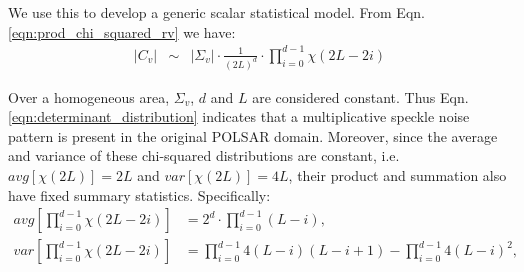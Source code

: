 \documentclass[]{tRSL2e}
\begin{document}
We use this to develop a generic scalar statistical model. %
From Eqn. \ref{eqn:prod_chi_squared_rv} we have:
\vspace{-2mm}
\begin{eqnarray}
  |C_v| &\sim& |\Sigma_v| \cdot \frac{1}{(2L)^d} \cdot \prod_{i=0}^{d-1} \chi (2L-2i) \label{eqn:determinant_distribution} %
\end{eqnarray}

Over a homogeneous area, $\Sigma_v$, $d$ and $L$ are considered constant.
Thus Eqn. \ref{eqn:determinant_distribution} indicates that a multiplicative speckle noise pattern is present 
  in the original POLSAR domain.
Moreover, since the average and variance of these chi-squared distributions are %
constant, i.e. $avg \left[ \chi(2L) \right] = 2L$ and $var \left[ \chi(2L) \right] = 4L$,
  their product and summation also have fixed summary statistics.
Specifically:
\vspace{-2mm}
{
\begin{align*}
  avg \left[ \prod^{d-1}_{i=0} \chi(2L-2i) \right] &= 2^d \cdot \prod^{d-1}_{i=0} (L-i), \\
  var \left[ \prod^{d-1}_{i=0} \chi(2L-2i) \right] &= \prod^{d-1}_{i=0} 4(L-i)(L-i+1) - \prod^{d-1}_{i=0} 4(L-i)^2, %
\end{align*}
}
\end{document}
